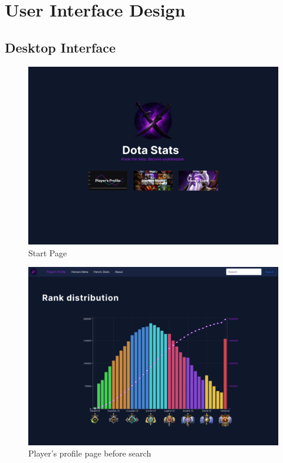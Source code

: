 \section{User Interface Design}

    \subsection{Desktop Interface}

    \begin{figure}[h]
        \centering
        \includegraphics[width=\textwidth]{images/Start}
        \caption{Start Page}
    \end{figure}

    \begin{figure}[h]
        \centering
        \includegraphics[width=\textwidth]{images/PlayerProfileStartPage}
        \caption{Player's profile page before search}
    \end{figure}

